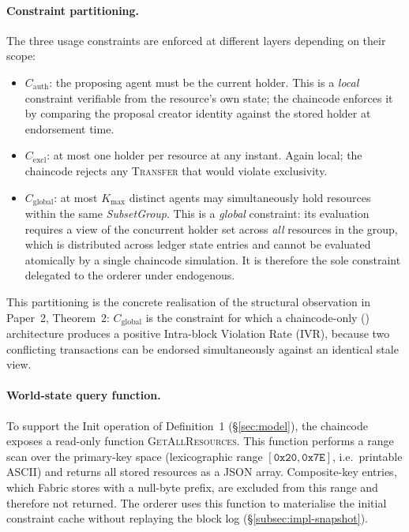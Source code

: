 \paragraph{Constraint partitioning.}
The three usage constraints are enforced at different layers depending on their
scope:
\begin{itemize}
  \item \textbf{\(C_\text{auth}\)}: the proposing agent must be the current
    holder.  This is a \emph{local} constraint verifiable from the resource's
    own state; the chaincode enforces it by comparing the proposal creator
    identity against the stored holder at endorsement time.
  \item \textbf{\(C_\text{excl}\)}: at most one holder per resource at any
    instant.  Again local; the chaincode rejects any \textsc{Transfer} that
    would violate exclusivity.
  \item \textbf{\(C_\text{global}\)}: at most $K_\text{max}$ distinct agents
    may simultaneously hold resources within the same \emph{SubsetGroup}.
    This is a \emph{global} constraint: its evaluation requires a view of the
    concurrent holder set across \emph{all} resources in the group, which is
    distributed across ledger state entries and cannot be evaluated atomically
    by a single chaincode simulation.  It is therefore the sole constraint
    delegated to the orderer under  endogenous.
\end{itemize}

This partitioning is the concrete realisation of the structural observation in
Paper~2, Theorem~2: $C_\text{global}$ is the constraint for which a
chaincode-only () architecture produces a positive Intra-block
Violation Rate (IVR), because two conflicting transactions can be endorsed
simultaneously against an identical stale view.

\paragraph{World-state query function.}
To support the Init operation of Definition~1 (\S\ref{sec:model}), the
chaincode exposes a read-only function \textsc{GetAllResources}.  This function
performs a range scan over the primary-key space (lexicographic range
$[\texttt{0x20},\texttt{0x7E}]$, i.e.\ printable ASCII) and returns all
stored resources as a JSON array.  Composite-key entries, which Fabric stores
with a null-byte prefix, are excluded from this range and therefore not
returned.  The orderer uses this function to materialise the initial constraint
cache without replaying the block log (\S\ref{subsec:impl-snapshot}).

